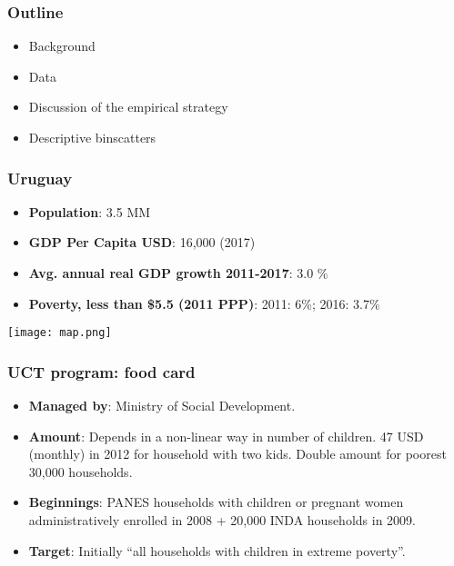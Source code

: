 \documentclass{beamer}
\begin{document}
\begin{frame}
\frametitle{Outline}
\begin{itemize}
\item Background
\item Data
\item Discussion of the empirical strategy
\item Descriptive binscatters
\end{itemize}
\end{frame}

\begin{frame}
\frametitle{Uruguay}
\begin{itemize}
\item \textbf{Population}: 3.5 MM
\item \textbf{GDP Per Capita USD}: 16,000 (2017)
\item \textbf{Avg. annual real GDP growth 2011-2017}: 3.0 \%
\item \textbf{Poverty, less than \$5.5 (2011 PPP)}: 2011: 6\%; 2016: 3.7\%	
\end{itemize}
\begin{center}
	\texttt{[image: map.png]}
	\label{map}
\end{center}
\end{frame}

\begin{frame}
\frametitle{UCT program: food card}
\begin{itemize}
\item \textbf{Managed by}: Ministry of Social Development.
\item \textbf{Amount}: Depends in a non-linear way in number of children. 47 USD (monthly) in 2012 for household with two kids. Double amount for poorest 30,000 households.
\item \textbf{Beginnings}: PANES households with children or pregnant women administratively enrolled in 2008 + 20,000 INDA households in 2009.
\item \textbf{Target}: Initially ``all households with children in extreme poverty''.		
\end{itemize}
\end{frame}
\end{document}
